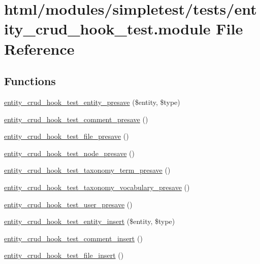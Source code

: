 \hypertarget{entity__crud__hook__test_8module}{
\section{html/modules/simpletest/tests/entity\_\-crud\_\-hook\_\-test.module File Reference}
\label{entity__crud__hook__test_8module}
}
\subsection*{Functions}
\begin{DoxyCompactItemize}
\item 
\hyperlink{entity__crud__hook__test_8module_a2decbfb4cd256d3e883d3cc548e2af34}{entity\_\-crud\_\-hook\_\-test\_\-entity\_\-presave} (\$entity, \$type)
\item 
\hyperlink{entity__crud__hook__test_8module_ac358c64364ceaad04591120d7f2b22a3}{entity\_\-crud\_\-hook\_\-test\_\-comment\_\-presave} ()
\item 
\hyperlink{entity__crud__hook__test_8module_a821ebf9133ef1963425047e323a6d9d2}{entity\_\-crud\_\-hook\_\-test\_\-file\_\-presave} ()
\item 
\hyperlink{entity__crud__hook__test_8module_a8ecf1af154103b6ca4b51bffd0885e05}{entity\_\-crud\_\-hook\_\-test\_\-node\_\-presave} ()
\item 
\hyperlink{entity__crud__hook__test_8module_a8e0cc954f710ca1500fc1072f43f7bfc}{entity\_\-crud\_\-hook\_\-test\_\-taxonomy\_\-term\_\-presave} ()
\item 
\hyperlink{entity__crud__hook__test_8module_acb8fb5a9521edb9eb701e752b46c2764}{entity\_\-crud\_\-hook\_\-test\_\-taxonomy\_\-vocabulary\_\-presave} ()
\item 
\hyperlink{entity__crud__hook__test_8module_a4d5d2a6760b45098f849cfd4fae46d7c}{entity\_\-crud\_\-hook\_\-test\_\-user\_\-presave} ()
\item 
\hyperlink{entity__crud__hook__test_8module_a3519aa24e8f9a1c5fa48a0cb61e5ba14}{entity\_\-crud\_\-hook\_\-test\_\-entity\_\-insert} (\$entity, \$type)
\item 
\hyperlink{entity__crud__hook__test_8module_ab43c52c22aad2100059e9e0408be40fc}{entity\_\-crud\_\-hook\_\-test\_\-comment\_\-insert} ()
\item 
\hyperlink{entity__crud__hook__test_8module_a19376773216fb93ad6b9737ff73e093e}{entity\_\-crud\_\-hook\_\-test\_\-file\_\-insert} ()

\end{DoxyCompactItemize}
